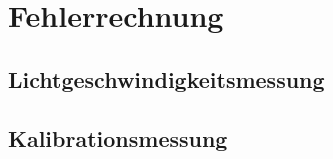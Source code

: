 \section{Fehlerrechnung}

\subsection{Lichtgeschwindigkeitsmessung}

\subsection{Kalibrationsmessung}



